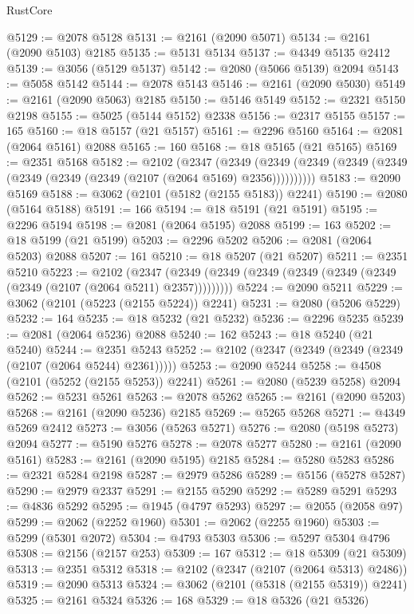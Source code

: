 \begin{lexlean}{RustCore}
\begin{coremodule}
@5129 := @2078 @5128
@5131 := @2161 (@2090 @5071)
@5134 := @2161 (@2090 @5103) @2185
@5135 := @5131 @5134
@5137 := @4349 @5135 @2412
@5139 := @3056 (@5129 @5137)
@5142 := @2080 (@5066 @5139) @2094
@5143 := @5058 @5142
@5144 := @2078 @5143
@5146 := @2161 (@2090 @5030)
@5149 := @2161 (@2090 @5063) @2185
@5150 := @5146 @5149
@5152 := @2321 @5150 @2198
@5155 := @5025 (@5144 @5152) @2338
@5156 := @2317 @5155
@5157 := 165
@5160 := @18 @5157 (@21 @5157)
@5161 := @2296 @5160
@5164 := @2081 (@2064 @5161) @2088
@5165 := 160
@5168 := @18 @5165 (@21 @5165)
@5169 := @2351 @5168
@5182 := @2102
    (@2347
      (@2349 (@2349 (@2349 (@2349 (@2349 (@2349 (@2349 (@2349 (@2107 (@2064 @5169) @2356))))))))))
@5183 := @2090 @5169
@5188 := @3062 (@2101 (@5182 (@2155 @5183)) @2241)
@5190 := @2080 (@5164 @5188)
@5191 := 166
@5194 := @18 @5191 (@21 @5191)
@5195 := @2296 @5194
@5198 := @2081 (@2064 @5195) @2088
@5199 := 163
@5202 := @18 @5199 (@21 @5199)
@5203 := @2296 @5202
@5206 := @2081 (@2064 @5203) @2088
@5207 := 161
@5210 := @18 @5207 (@21 @5207)
@5211 := @2351 @5210
@5223 := @2102
    (@2347 (@2349 (@2349 (@2349 (@2349 (@2349 (@2349 (@2349 (@2107 (@2064 @5211) @2357)))))))))
@5224 := @2090 @5211
@5229 := @3062 (@2101 (@5223 (@2155 @5224)) @2241)
@5231 := @2080 (@5206 @5229)
@5232 := 164
@5235 := @18 @5232 (@21 @5232)
@5236 := @2296 @5235
@5239 := @2081 (@2064 @5236) @2088
@5240 := 162
@5243 := @18 @5240 (@21 @5240)
@5244 := @2351 @5243
@5252 := @2102 (@2347 (@2349 (@2349 (@2349 (@2107 (@2064 @5244) @2361)))))
@5253 := @2090 @5244
@5258 := @4508 (@2101 (@5252 (@2155 @5253)) @2241)
@5261 := @2080 (@5239 @5258) @2094
@5262 := @5231 @5261
@5263 := @2078 @5262
@5265 := @2161 (@2090 @5203)
@5268 := @2161 (@2090 @5236) @2185
@5269 := @5265 @5268
@5271 := @4349 @5269 @2412
@5273 := @3056 (@5263 @5271)
@5276 := @2080 (@5198 @5273) @2094
@5277 := @5190 @5276
@5278 := @2078 @5277
@5280 := @2161 (@2090 @5161)
@5283 := @2161 (@2090 @5195) @2185
@5284 := @5280 @5283
@5286 := @2321 @5284 @2198
@5287 := @2979 @5286
@5289 := @5156 (@5278 @5287)
@5290 := @2979 @2337
@5291 := @2155 @5290
@5292 := @5289 @5291
@5293 := @4836 @5292
@5295 := @1945 (@4797 @5293)
@5297 := @2055 (@2058 @97)
@5299 := @2062 (@2252 @1960)
@5301 := @2062 (@2255 @1960)
@5303 := @5299 (@5301 @2072)
@5304 := @4793 @5303
@5306 := @5297 @5304 @4796
@5308 := @2156 (@2157 @253)
@5309 := 167
@5312 := @18 @5309 (@21 @5309)
@5313 := @2351 @5312
@5318 := @2102 (@2347 (@2107 (@2064 @5313) @2486))
@5319 := @2090 @5313
@5324 := @3062 (@2101 (@5318 (@2155 @5319)) @2241)
@5325 := @2161 @5324
@5326 := 168
@5329 := @18 @5326 (@21 @5326)

\end{coremodule}
\end{lexlean}
